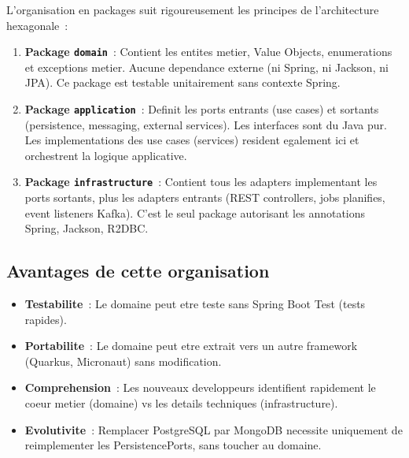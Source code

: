 \documentclass[12pt,a4paper]{report}
\begin{document}
L'organisation en packages suit rigoureusement les principes de l'architecture
hexagonale~:

\begin{enumerate}[leftmargin=2cm]
  \item \textbf{Package \texttt{domain}}~: Contient les entites metier,
        Value Objects, enumerations et exceptions metier. Aucune dependance
        externe (ni Spring, ni Jackson, ni JPA). Ce package est testable
        unitairement sans contexte Spring.
        
  \item \textbf{Package \texttt{application}}~: Definit les ports entrants
        (use cases) et sortants (persistence, messaging, external services).
        Les interfaces sont du Java pur. Les implementations des use cases
        (services) resident egalement ici et orchestrent la logique applicative.
        
  \item \textbf{Package \texttt{infrastructure}}~: Contient tous les adapters
        implementant les ports sortants, plus les adapters entrants (REST
        controllers, jobs planifies, event listeners Kafka). C'est le seul
        package autorisant les annotations Spring, Jackson, R2DBC.
\end{enumerate}

\subsection{Avantages de cette organisation}

\begin{itemize}[leftmargin=2cm]
  \item \textbf{Testabilite}~: Le domaine peut etre teste sans Spring Boot
        Test (tests rapides).
  \item \textbf{Portabilite}~: Le domaine peut etre extrait vers un autre
        framework (Quarkus, Micronaut) sans modification.
  \item \textbf{Comprehension}~: Les nouveaux developpeurs identifient
        rapidement le coeur metier (domaine) vs les details techniques
        (infrastructure).
  \item \textbf{Evolutivite}~: Remplacer PostgreSQL par MongoDB necessite
        uniquement de reimplementer les PersistencePorts, sans toucher
        au domaine.
\end{itemize}
\end{document}

